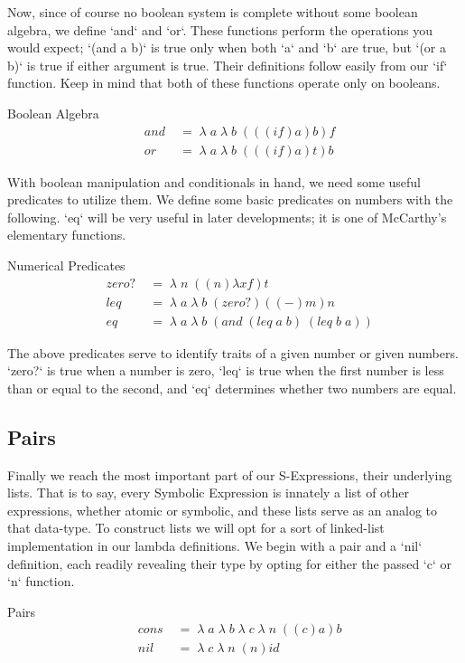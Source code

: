 \documentclass[11pt]{article}
\begin{document}
Now, since of course no boolean system is complete without some boolean algebra, we define `and` and `or`. These functions perform the operations you would expect; `(and a b)` is true only when both `a` and `b` are true, but `(or a b)` is true if either argument is true. Their definitions follow easily from our `if` function. Keep in mind that both of these functions operate only on booleans.

Boolean Algebra
\begin{align*}
& and \; &= \; \lambda \; a \; \lambda \; b \; (((if)a)b)f
\\& or \; &= \; \lambda \; a \; \lambda \; b \; (((if)a)t)b
\end{align*}

With boolean manipulation and conditionals in hand, we need some useful predicates to utilize them. We define some basic predicates on numbers with the following. `eq` will be very useful in later developments; it is one of McCarthy's elementary functions.

Numerical Predicates
\begin{align*}
& zero? \; &= \; \lambda \; n \; ((n)λxf)t
\\& leq \; &= \; \lambda \; a \; \lambda \; b \; (zero?)((-)m)n
\\& eq \; &= \; \lambda \; a \; \lambda \; b \; (and \; (leq \; a \; b) \; (leq \; b \; a))
\end{align*}

The above predicates serve to identify traits of a given number or given numbers. `zero?` is true when a number is zero, `leq` is true when the first number is less than or equal to the second, and `eq` determines whether two numbers are equal.

\subsection{Pairs}
Finally we reach the most important part of our S-Expressions, their underlying lists. That is to say, every Symbolic Expression is innately a list of other expressions, whether atomic or symbolic, and these lists serve as an analog to that data-type. To construct lists we will opt for a sort of linked-list implementation in our lambda definitions. We begin with a pair and a `nil` definition, each readily revealing their type by opting for either the passed `c` or `n` function.

Pairs
\begin{align*}
& cons \; &= \; \lambda \; a \; \lambda \; b \; \lambda \; c \; \lambda \; n \; ((c)a)b
\\& nil \; &= \; \lambda \; c \; \lambda \; n \; (n)id
\end{align*}
\end{document}
